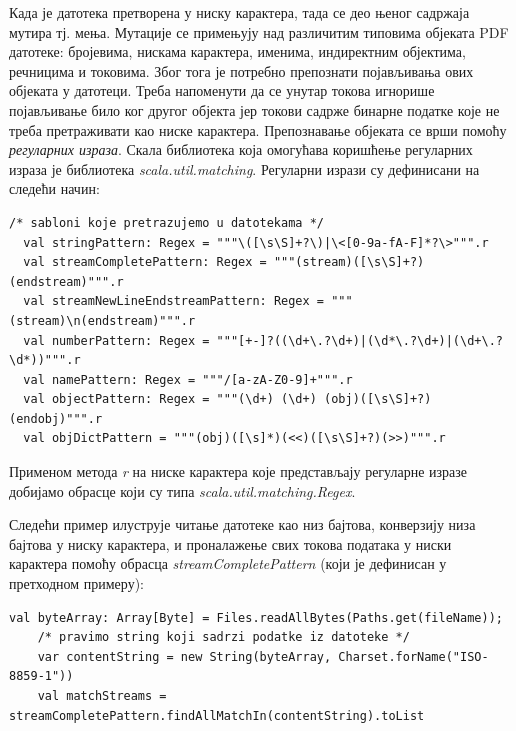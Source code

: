 \documentclass[12pt,oneside]{memoir}
\begin{document}
Када је датотека претворена у ниску карактера, тада се део њеног садржаја мутира тј. мења. Мутације се примењују над различитим типовима објеката PDF датотеке: бројевима, нискама карактера, именима, индиректним објектима, речницима и токовима. Због тога је потребно препознати појављивања ових објеката у датотеци. Треба напоменути да се унутар токова игнорише појављивање било ког другог објекта јер токови садрже бинарне податке које не треба претраживати као ниске карактера. Препознавање објеката се врши помоћу \textit{регуларних израза}. 
%
Скала библиотека која омогућава коришћење регуларних израза је библиотека \textit{scala.util.matching}. Регуларни изрази су дефинисани на следећи начин:

\begin{lstlisting}[frame=single]
    /* sabloni koje pretrazujemo u datotekama */
  val stringPattern: Regex = """\([\s\S]+?\)|\<[0-9a-fA-F]*?\>""".r
  val streamCompletePattern: Regex = """(stream)([\s\S]+?)(endstream)""".r
  val streamNewLineEndstreamPattern: Regex = """(stream)\n(endstream)""".r
  val numberPattern: Regex = """[+-]?((\d+\.?\d+)|(\d*\.?\d+)|(\d+\.?\d*))""".r
  val namePattern: Regex = """/[a-zA-Z0-9]+""".r
  val objectPattern: Regex = """(\d+) (\d+) (obj)([\s\S]+?)(endobj)""".r
  val objDictPattern = """(obj)([\s]*)(<<)([\s\S]+?)(>>)""".r    
\end{lstlisting}

Применом метода \textit{r} на ниске карактера које представљају регуларне изразе добијамо обрасце који су типа \textit{scala.util.matching.Regex}.

Следећи пример илуструје читање датотеке као низ бајтова, конверзију низа бајтова у ниску карактера, и проналажење свих токова података у ниски карактера помоћу обрасца \textit{streamCompletePattern} (који је дефинисан у претходном примеру):

\begin{lstlisting}[frame=single]
    val byteArray: Array[Byte] = Files.readAllBytes(Paths.get(fileName));
    /* pravimo string koji sadrzi podatke iz datoteke */
    var contentString = new String(byteArray, Charset.forName("ISO-8859-1"))
    val matchStreams = streamCompletePattern.findAllMatchIn(contentString).toList
\end{lstlisting}
\end{document}
